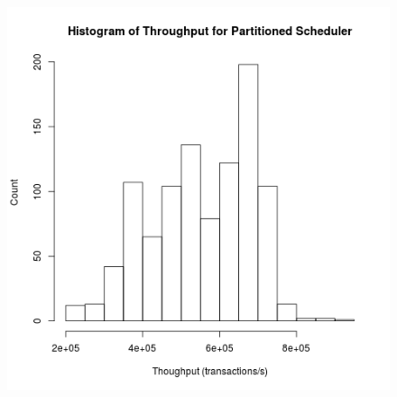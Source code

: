 \clearpage


\begin{figure}
\center
\includegraphics[width=\textwidth]{partitioned_throughput_hist.png}
\caption{\label{partitioned_throughput}}
\end{figure}

